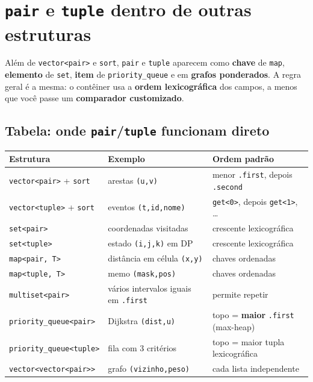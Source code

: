 \section{\texttt{pair} e \texttt{tuple} dentro de outras estruturas}

Além de \texttt{vector<pair>} e \texttt{sort}, \texttt{pair} e \texttt{tuple} aparecem como \textbf{chave} de \texttt{map}, \textbf{elemento} de \texttt{set}, \textbf{item} de \texttt{priority\_queue} e em \textbf{grafos ponderados}. A regra geral é a mesma: o contêiner usa a \textbf{ordem lexicográfica} dos campos, a menos que você passe um \textbf{comparador customizado}.

\subsection{Tabela: onde \texttt{pair}/\texttt{tuple} funcionam direto}

\begin{center}
\small
\begin{tabular}{@{}lll@{}}
  \toprule
  \textbf{Estrutura} & \textbf{Exemplo} & \textbf{Ordem padrão} \\
  \midrule
  \texttt{vector<pair>} + \texttt{sort} & arestas \texttt{(u,v)} & menor \texttt{.first}, depois \texttt{.second} \\
  \texttt{vector<tuple>} + \texttt{sort} & eventos \texttt{(t,id,nome)} & \texttt{get<0>}, depois \texttt{get<1>}, \ldots \\
  \texttt{set<pair>} & coordenadas visitadas & crescente lexicográfica \\
  \texttt{set<tuple>} & estado \texttt{(i,j,k)} em DP & crescente lexicográfica \\
  \texttt{map<pair, T>} & distância em célula \texttt{(x,y)} & chaves ordenadas \\
  \texttt{map<tuple, T>} & memo \texttt{(mask,pos)} & chaves ordenadas \\
  \texttt{multiset<pair>} & vários intervalos iguais em \texttt{.first} & permite repetir \\
  \texttt{priority\_queue<pair>} & Dijkstra \texttt{(dist,u)} & topo = \textbf{maior} \texttt{.first} (max-heap) \\
  \texttt{priority\_queue<tuple>} & fila com 3 critérios & topo = maior tupla lexicográfica \\
  \texttt{vector<vector<pair>>} & grafo \texttt{(vizinho,peso)} & cada lista independente \\
  \bottomrule
\end{tabular}
\end{center}

